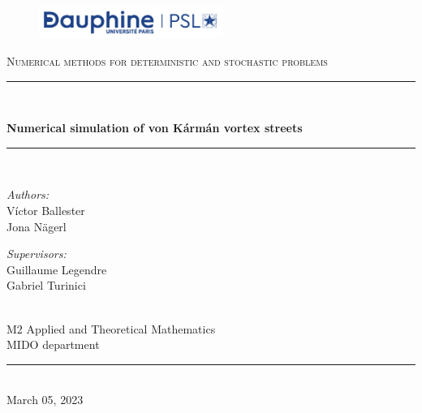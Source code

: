\documentclass[a4paper, 12pt]{article}
\renewcommand\title{Numerical simulation of von Kármán vortex streets}
\renewcommand\author{Víctor Ballester\\Jona Nägerl}
\renewcommand\date{March 05, 2023}
\newcommand\supervisor{Guillaume Legendre\\Gabriel Turinici}
\newcommand\department{MIDO department}
\newcommand\degree{M2 Applied and Theoretical Mathematics}
\begin{document}
\begin{titlepage}
  \begin{center}
    \begin{figure}[H]
      \begin{center}
        \includegraphics[width=6cm]{0_graphics/dauphine-psl.pdf}
      \end{center}
    \end{figure}
    \vspace*{1.5cm}
    \textsc{\Large Numerical methods for deterministic and stochastic problems }\\[0.75cm]
    \rule{150mm}{0.1mm}\\[0.4cm]
    {\huge \bfseries \title\par}
    \vspace{0.4cm} %
    \rule{150mm}{0.1mm} \\[1.5cm] %
    \begin{minipage}[ht]{0.4\textwidth}
      \begin{flushleft} \large
        \emph{Authors:}\\[0.2cm]
        \author %
      \end{flushleft}
    \end{minipage}
    \begin{minipage}[ht]{0.4\textwidth}
      \begin{flushright} \large
        \emph{Supervisors:} \\[0.2cm]
        \supervisor %
      \end{flushright}
    \end{minipage}\\[3cm]
    \vfill
    {\large
      \degree\\[0.2cm]
      \department\\[0.2cm]
    }
    \rule{80mm}{0.1mm}\\[0.5cm]
    {\large \date}\\[0.2cm]
    \vfill
  \end{center}
  \newpage
\end{titlepage}
\end{document}
